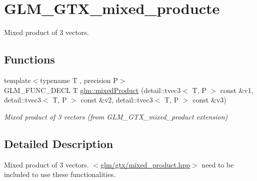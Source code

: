\hypertarget{group__gtx__mixed__product}{\section{G\-L\-M\-\_\-\-G\-T\-X\-\_\-mixed\-\_\-producte}
\label{group__gtx__mixed__product}
}


Mixed product of 3 vectors.  


\subsection*{Functions}
\begin{DoxyCompactItemize}
\item 
\hypertarget{group__gtx__mixed__product_ga3c7ec94fdd2b088eac78fb4a0211f32d}{{\footnotesize template$<$typename T , precision P$>$ }\\G\-L\-M\-\_\-\-F\-U\-N\-C\-\_\-\-D\-E\-C\-L T \hyperlink{group__gtx__mixed__product_ga3c7ec94fdd2b088eac78fb4a0211f32d}{glm\-::mixed\-Product} (detail\-::tvec3$<$ T, P $>$ const \&v1, detail\-::tvec3$<$ T, P $>$ const \&v2, detail\-::tvec3$<$ T, P $>$ const \&v3)}\label{group__gtx__mixed__product_ga3c7ec94fdd2b088eac78fb4a0211f32d}

\begin{DoxyCompactList}\small\item\em Mixed product of 3 vectors (from G\-L\-M\-\_\-\-G\-T\-X\-\_\-mixed\-\_\-product extension) \end{DoxyCompactList}\end{DoxyCompactItemize}


\subsection{Detailed Description}
Mixed product of 3 vectors. $<$\hyperlink{mixed__product_8hpp}{glm/gtx/mixed\-\_\-product.\-hpp}$>$ need to be included to use these functionalities. 